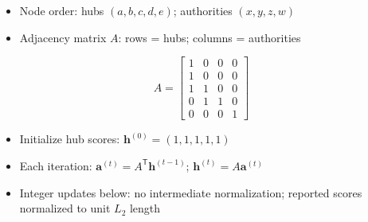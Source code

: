 \begin{itemize}
    \item Node order: hubs \((a,b,c,d,e)\); authorities \((x,y,z,w)\)
    \item Adjacency matrix \(A\): rows = hubs; columns = authorities
\end{itemize}

\[
    A =
    \begin{bmatrix}
        1 & 0 & 0 & 0 \\
        1 & 0 & 0 & 0 \\
        1 & 1 & 0 & 0 \\
        0 & 1 & 1 & 0 \\
        0 & 0 & 0 & 1
    \end{bmatrix}
\]

\begin{itemize}
    \item Initialize hub scores: \(\mathbf{h}^{(0)}=(1,1,1,1,1)\)
    \item Each iteration: \(\mathbf{a}^{(t)}=A^\mathsf{T}\mathbf{h}^{(t-1)}\); \(\mathbf{h}^{(t)}=A\mathbf{a}^{(t)}\)
    \item Integer updates below: no intermediate normalization; reported scores normalized to unit \(L_2\) length
\end{itemize}

